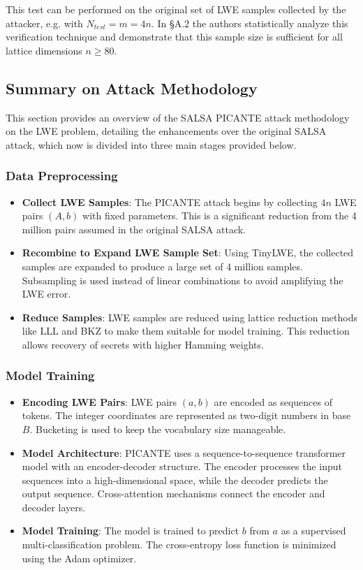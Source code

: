 \documentclass{article}
\begin{document}
This test can be performed on the original set of LWE samples collected by the attacker, e.g. with \( N_{test} = m = 4n \). In §A.2 the authors statistically analyze this verification technique and demonstrate that this sample size is sufficient for all lattice dimensions \( n \geq 80 \).

\subsection{Summary on Attack Methodology}

This section provides an overview of the SALSA PICANTE attack methodology on the LWE problem, detailing the enhancements over the original SALSA attack, which now is divided into three main stages provided below.

\subsubsection{Data Preprocessing}

\begin{itemize}
    \item \textbf{Collect LWE Samples}: The PICANTE attack begins by collecting \(4n\) LWE pairs \((A, b)\) with fixed parameters. This is a significant reduction from the 4 million pairs assumed in the original SALSA attack.
    \item \textbf{Recombine to Expand LWE Sample Set}: Using TinyLWE, the collected samples are expanded to produce a large set of 4 million samples. Subsampling is used instead of linear combinations to avoid amplifying the LWE error.
    \item \textbf{Reduce Samples}: LWE samples are reduced using lattice reduction methods like LLL and BKZ to make them suitable for model training. This reduction allows recovery of secrets with higher Hamming weights.
\end{itemize}

\subsubsection{Model Training}

\begin{itemize}
    \item \textbf{Encoding LWE Pairs}: LWE pairs \((a, b)\) are encoded as sequences of tokens. The integer coordinates are represented as two-digit numbers in base \(B\). Bucketing is used to keep the vocabulary size manageable.
    \item \textbf{Model Architecture}: PICANTE uses a sequence-to-sequence transformer model with an encoder-decoder structure. The encoder processes the input sequences into a high-dimensional space, while the decoder predicts the output sequence. Cross-attention mechanisms connect the encoder and decoder layers.
    \item \textbf{Model Training}: The model is trained to predict \(b\) from \(a\) as a supervised multi-classification problem. The cross-entropy loss function is minimized using the Adam optimizer.
\end{itemize}
\end{document}
